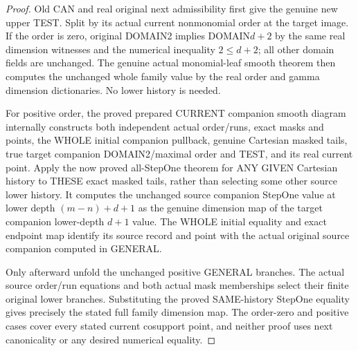 \begin{proof}
Old CAN and real original next admissibility first give the genuine new
upper TEST. Split by its actual current nonmonomial order at the target
image. If the order is zero, original DOMAIN2 implies DOMAIN$d+2$ by the
same real dimension witnesses and the numerical inequality $2\le d+2$;
all other domain fields are unchanged. The genuine actual monomial-leaf
smooth theorem then computes the unchanged whole family value by the real
order and gamma dimension dictionaries. No lower history is needed.

For positive order, the proved prepared CURRENT companion smooth diagram
internally constructs both independent actual order/runs, exact masks and
points, the WHOLE initial companion pullback, genuine Cartesian masked
tails, true target companion DOMAIN2/maximal order and TEST, and its real
current point. Apply the now proved all-StepOne theorem for ANY GIVEN
Cartesian history to THESE exact masked tails, rather than selecting some
other source lower history. It computes the unchanged source companion
StepOne value at lower depth $(m-n)+d+1$ as the genuine dimension map of
the target companion lower-depth $d+1$ value. The WHOLE initial equality
and exact endpoint map identify its source record and point with the
actual original source companion computed in GENERAL.

Only afterward unfold the unchanged positive GENERAL branches. The actual
source order/run equations and both actual mask memberships select their
finite original lower branches. Substituting the proved SAME-history
StepOne equality gives precisely the stated full family dimension map.
The order-zero and positive cases cover every stated current cosupport
point, and neither proof uses next canonicality or any desired numerical
equality.
\end{proof}

